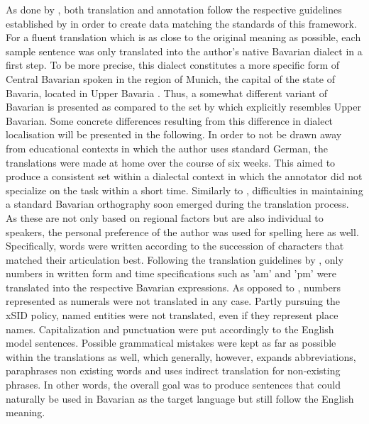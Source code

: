 \documentclass[11pt,a4paper,twoside,openright]{scrbook}
\begin{document}
As done by \citet{winkler-etal-2024-slot-intent}, both translation and annotation follow the respective guidelines established by \citet{van-der-goot-etal-2021-masked} in order to create data matching the standards of this framework. For a fluent translation which is as close to the original meaning as possible, each sample sentence was only translated into the author's native Bavarian dialect in a first step. To be more precise, this dialect constitutes a more specific form of Central Bavarian spoken in the region of Munich, the capital of the state of Bavaria, located in Upper Bavaria \citep{wiesinger1983deutschedialekte}. Thus, a somewhat different variant of Bavarian is presented as compared to the set by \citet{winkler-etal-2024-slot-intent} which explicitly resembles Upper Bavarian. Some concrete differences resulting from this difference in dialect localisation will be presented in the following. In order to not be drawn away from educational contexts in which the author uses standard German, the translations were made at home over the course of six weeks. This aimed to produce a consistent set within a dialectal context in which the annotator did not specialize on the task within a short time. Similarly to \citet{winkler-etal-2024-slot-intent}, difficulties in maintaining a standard Bavarian orthography soon emerged during the translation process. As these are not only based on regional factors but are also individual to speakers, the personal preference of the author was used for spelling here as well. Specifically, words were written according to the succession of characters that matched their articulation best. Following the translation guidelines by \citet{van-der-goot-etal-2021-masked}, only numbers in written form and time specifications such as 'am' and 'pm' were translated into the respective Bavarian expressions. As opposed to \citet{winkler-etal-2024-slot-intent}, numbers represented as numerals were not translated in any case. Partly pursuing the xSID policy, named entities were not translated, even if they represent place names. Capitalization and punctuation were put accordingly to the English model sentences. Possible grammatical mistakes were kept as far as possible within the translations as well, which generally, however, expands abbreviations, paraphrases non existing words and uses indirect translation for non-existing phrases. In other words, the overall goal was to produce sentences that could naturally be used in Bavarian as the target language but still follow the English meaning. 
\end{document}
